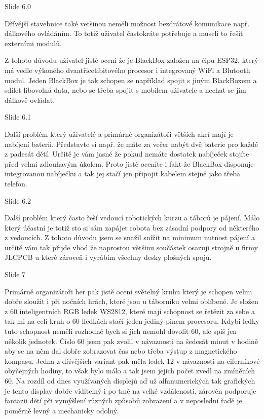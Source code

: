 
Slide 6.0

Dřívější stavebnice také vetšinou neměli možnost bezdrátové komunikace např. dálkového ovládáním.
To totiž uživatel častokráte potřebuje a museli to řešit externími modulů.

Z tohoto důvodu uživatel jistě ocení že je BlackBox založen na čipu ESP32, 
který má vedle výkoného dvaatřicetibitového procesor i integrovaný WiFi a Blutooth modul. 
Jeden BlackBox je tak schopen se například spojit s jiným BlackBoxem a sdílet libovolná data, 
nebo se třeba spojit s mobilem uživatele a nechat se jím dálkově ovládat. %

Slide 6.1

Další problém který uživatelé a primárně organizátoři větších akcí mají je nabíjení baterii. 
Představte si např. že máte za večer nabýt dvě baterie pro každé z padesát dětí. Určitě je vám jasné že pokud 
nemáte dostatek nabíječek stojíte před velmi zdlouhavým úkolem.
Proto jistě oceníte i fakt že BlackBox disponuje integrovanou nabíječku a tak jej stačí 
jen připojit kabelem stejně jako třeba telefon.

Slide 6.2

Další problém který často řeší vedoucí robotických kurzu a táborů je pájení. Málo který účastní 
je totiž sto si sám zapájet robota bez zásadní podpory od některého z vedoucích. Z tohoto důvodu jsem 
se snažil snížit na minimum nutnost pájení a určitě vám tak přijde vhod že naprostou většinu součástek 
osazuji strojně u firmy JLCPCB u které zároveň i vyrábím všechny desky plošných spojů. %

Slide 7

Primárně organizátoři her pak jistě ocení světelný kruhu který je schopen velmi dobře sloužit i při nočních hrách,
které jsou u táborníku velmi oblíbené.
Je složen z 60 inteligentních RGB ledek WS2812, které mají schopnost se řetězit za sebe a tak mi na celí kruh o 60 lledkách
stačí jeden jediný pinem procesoru. Kdybi ledky tuto schopnost neměli rozhodně bych si jich nemohl dovolit 60,
ale spíš jen několik jednotek. Číslo 60 jsem pak zvolil v návaznosti na šedesát 
minut v hodině aby se na něm dal dobře zobrazovat čas nebo třeba výstup z magnetického kompasu. 
Jedna z dřívějších variant pak měla ledek 12 v návaznosti na ciferníkové obyčejných hodiny,
to však bylo málo a tak jsem jejich počet zvedl na zmíněních 60.
Na rozdíl od dnes využívaných displejů aď už alfanumerických tak grafických je tento display dobře viditelný i po tmě na velké vzdálenosti, 
zárověn podporuje fantazii dětí při vymýšlení různých způsobů zobrazení a v neposlední řadě je poměrně levný a mechanicky odolný. %


